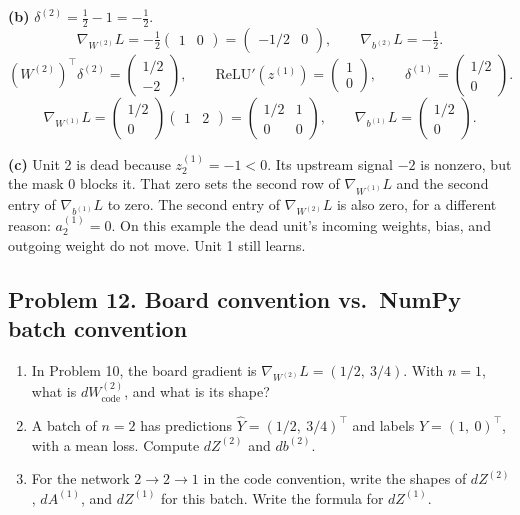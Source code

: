 \textbf{(b)} $\delta^{(2)} = \tfrac12 - 1 = -\tfrac12$.
\[
\nabla_{W^{(2)}}L = -\tfrac12\begin{pmatrix}1 & 0\end{pmatrix} = \begin{pmatrix}-1/2 & 0\end{pmatrix},\qquad \nabla_{b^{(2)}}L = -\tfrac12.
\]
\[
(W^{(2)})^\top\delta^{(2)} = \begin{pmatrix}1/2\\-2\end{pmatrix},\qquad \mathrm{ReLU}'(z^{(1)}) = \begin{pmatrix}1\\0\end{pmatrix},\qquad \delta^{(1)} = \begin{pmatrix}1/2\\0\end{pmatrix}.
\]
\[
\nabla_{W^{(1)}}L = \begin{pmatrix}1/2\\0\end{pmatrix}\begin{pmatrix}1 & 2\end{pmatrix} = \begin{pmatrix}1/2 & 1\\0 & 0\end{pmatrix},\qquad \nabla_{b^{(1)}}L = \begin{pmatrix}1/2\\0\end{pmatrix}.
\]

\textbf{(c)} Unit 2 is dead because $z^{(1)}_2 = -1 < 0$. Its upstream signal $-2$ is nonzero, but the mask 0 blocks it. That zero sets the second row of $\nabla_{W^{(1)}}L$ and the second entry of $\nabla_{b^{(1)}}L$ to zero. The second entry of $\nabla_{W^{(2)}}L$ is also zero, for a different reason: $a^{(1)}_2 = 0$. On this example the dead unit's incoming weights, bias, and outgoing weight do not move. Unit 1 still learns.

\subsection*{Problem 12. Board convention vs.\ NumPy batch convention}

\begin{enumerate}[label=(\alph*)]
\item In Problem 10, the board gradient is $\nabla_{W^{(2)}}L = (1/2,\ 3/4)$. With $n = 1$, what is $dW^{(2)}_{\text{code}}$, and what is its shape?
\item A batch of $n = 2$ has predictions $\hat Y = (1/2,\ 3/4)^\top$ and labels $Y = (1,\ 0)^\top$, with a mean loss. Compute $dZ^{(2)}$ and $db^{(2)}$.
\item For the network $2\to2\to1$ in the code convention, write the shapes of $dZ^{(2)}$, $dA^{(1)}$, and $dZ^{(1)}$ for this batch. Write the formula for $dZ^{(1)}$.
\end{enumerate}

